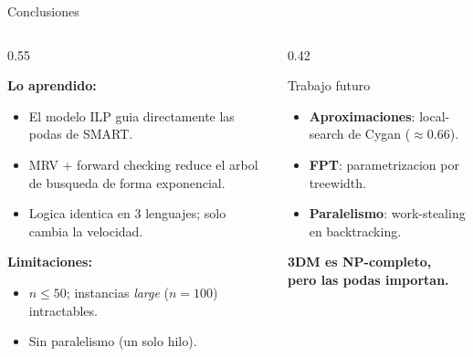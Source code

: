 \begin{frame}{Conclusiones}

\begin{columns}[T]
\begin{column}{0.55\textwidth}

\textbf{Lo aprendido:}
\begin{itemize}
  \item El modelo ILP guia directamente las podas de SMART.
  \item MRV + forward checking reduce el arbol de busqueda de forma exponencial.
  \item Logica identica en 3 lenguajes; solo cambia la velocidad.
\end{itemize}

\smallskip
\textbf{Limitaciones:}
\begin{itemize}
  \item $n \le 50$; instancias \textit{large} ($n{=}100$) intractables.
  \item Sin paralelismo (un solo hilo).
\end{itemize}

\end{column}

\begin{column}{0.42\textwidth}

\begin{block}{Trabajo futuro}
\begin{itemize}
  \item \textbf{Aproximaciones}: local-search de Cygan ($\approx 0.66$).
  \item \textbf{FPT}: parametrizacion por treewidth.
  \item \textbf{Paralelismo}: work-stealing en backtracking.
\end{itemize}
\end{block}

\medskip
\centering
\large
\textbf{3DM es NP-completo,}\\
\textbf{pero las podas importan.}

\end{column}
\end{columns}

\end{frame}
